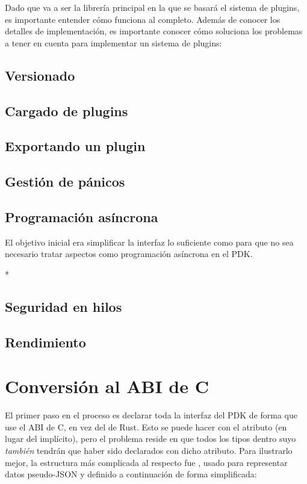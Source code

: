 Dado que \abistable va a ser la librería principal en la que se basará el
sistema de plugins, es importante entender cómo funciona al completo. Además de
conocer los detalles de implementación, es importante conocer cómo \abistable
soluciona los problemas a tener en cuenta para implementar un sistema de
plugins:

\subsection{Versionado}

\subsection{Cargado de plugins}

\subsection{Exportando un plugin}

\subsection{Gestión de pánicos}

\subsection{Programación asíncrona}

El objetivo inicial era simplificar la interfaz lo suficiente como para que no
sea necesario tratar aspectos como programación asíncrona en el PDK.

* 

\subsection{Seguridad en hilos}

\subsection{Rendimiento}\label{abiperf}

\section{Conversión al ABI de C}

El primer paso en el proceso es declarar toda la interfaz del PDK de forma que
use el ABI de C, en vez del de Rust. Esto se puede hacer con el atributo
\code{#[repr(C)]} (en lugar del  implícito), pero el
problema reside en que todos los tipos dentro suyo \emph{también} tendrán que
haber sido declarados con dicho atributo. Para ilustrarlo mejor, la estructura
más complicada al respecto fue , usado para representar datos
pseudo-JSON y definido a continuación de forma simplificada:

